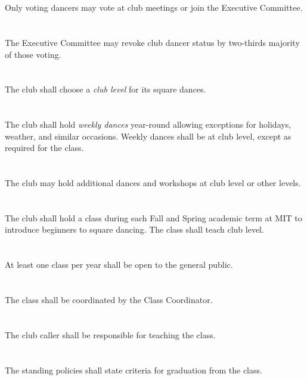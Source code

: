 \documentclass{bylaws}
\begin{document}
\section{}Only voting dancers may vote at club meetings or join the Executive Committee.
\section{}The Executive Committee may revoke club dancer status by two-thirds majority of those voting.


\section{}The club shall choose a \textit{club level} for its square dances.
\section{}The club shall hold \textit{weekly dances} year-round allowing exceptions for holidays, weather, and similar occasions. Weekly dances shall be at club level, except as required for the class.
\section{}The club may hold additional dances and workshops at club level or other levels.


\section{}The club shall hold a class during each Fall and Spring academic term at MIT to introduce beginners to square dancing. The class shall teach club level.
\section{}At least one class per year shall be open to the general public.
\section{}The class shall be coordinated by the Class Coordinator.
\section{}The club caller shall be responsible for teaching the class.
\section{}The standing policies shall state criteria for graduation from the class.
\end{document}
